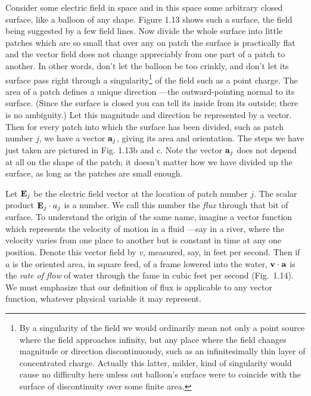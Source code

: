 Consider some electric field in space and in this space some
arbitrary closed surface, like a balloon of any shape. Figure 1.13
shows such a surface, the field being suggested by a few field lines.
Now divide the whole surface into little patches which are so small
that over any on patch the surface is practically flat and the vector
field does not change appreciably from one part of a patch to
another. In other words, don't let the balloon be too crinkly, and
don't let its surface pass right through a singularity\footnote{By a
singularity of the field we would ordinarily mean not only a point
source where the field approaches infinity, but any place where the
field changes magnitude or direction discontinuously, such as an
infinitesimally thin layer of concentrated charge.
Actually this latter, milder, kind of singularity would cause no
difficulty here unless out balloon's surface were to coincide with
the surface of discontinuity over some finite area.} of the field
such as a point charge. The area of a patch defines a unique
direction ---the outward-pointing normal to its surface. (Since the
surface is closed you can tell its inside from its outside; there is
no ambiguity.) Let this magnitude and direction be represented by a
vector. Then for every patch into which the surface has been divided,
such as patch number $j$, we have a vector $\mathbf{a}_j$, giving its area
and orientation. The steps we have just taken are pictured in Fig.
1.13b and c. Note the vector $\mathbf{a}_j$ does not depend at all on
the shape of the patch; it doesn't matter how we have divided up the
surface, as long as the patches are small enough.

Let $\mathbf{E}_j$ be the electric field vector at the location of patch
number $j$. The scalar product $\mathbf{E}_j \cdot a_j$ is a number.
We call this number the \emph{flux} through that bit of surface.
To understand the origin of the same name, imagine a vector function
which represents the velocity of motion in a fluid ---say in a river,
where the velocity varies from one place to another but is constant
in time at any one position. Denote this vector field by $v$,
measured, say, in feet per second. Then if $a$ is the oriented area,
in square feed, of a frame lowered into the water, $\mathbf{v} \cdot \mathbf{a}$
is the \emph{rate of flow} of water through the fame in cubic feet
per second (Fig.~1.14). We must emphasize that our definition of
flux is applicable to any vector function, whatever physical variable
it may represent.

